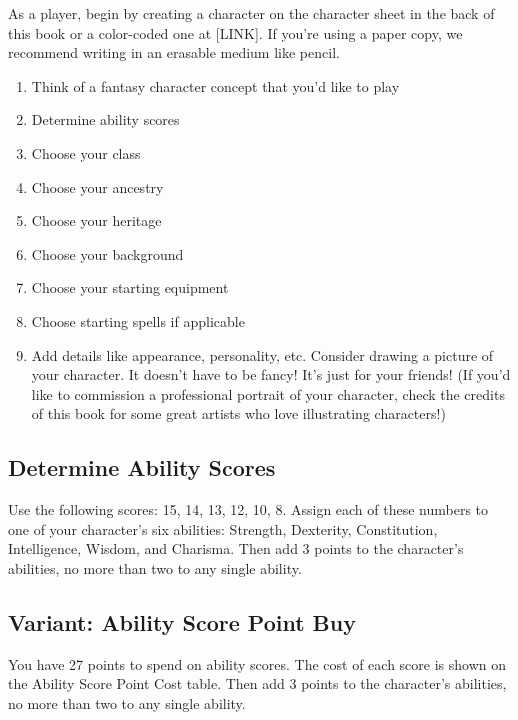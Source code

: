 As a player, begin by creating a character on the character sheet in the
back of this book or a color-coded one at {[}LINK{]}. If you're using a
paper copy, we recommend writing in an erasable medium like pencil.

\begin{enumerate}
\def\labelenumi{\arabic{enumi}.}
\item
  Think of a fantasy character concept that you'd like to play
\item
  Determine ability scores
\item
  Choose your class
\item
  Choose your ancestry
\item
  Choose your heritage
\item
  Choose your background
\item
  Choose your starting equipment
\item
  Choose starting spells if applicable
\item
  Add details like appearance, personality, etc. Consider drawing a
  picture of your character. It doesn't have to be fancy! It's just for
  your friends! (If you'd like to commission a professional portrait of
  your character, check the credits of this book for some great artists
  who love illustrating characters!)
\end{enumerate}

\subsection{Determine Ability Scores}\label{_determine_ability_scores}

Use the following scores: 15, 14, 13, 12, 10, 8. Assign each of these
numbers to one of your character's six abilities: Strength, Dexterity,
Constitution, Intelligence, Wisdom, and Charisma. Then add 3 points to
the character's abilities, no more than two to any single ability.

\subsection{Variant: Ability Score Point
Buy}\label{_variant_ability_score_point_buy}

You have 27 points to spend on ability scores. The cost of each score is
shown on the Ability Score Point Cost table. Then add 3 points to the
character's abilities, no more than two to any single ability.

